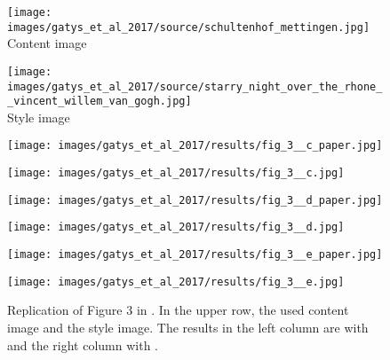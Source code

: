 \begin{figure}[H]
	\centering
	\begin{minipage}[t]{0.45\textwidth}
		\centering
		\texttt{[image: images/gatys\_et\_al\_2017/source/schultenhof\_mettingen.jpg]}
		Content image
	\end{minipage}
	\hfill%
	\begin{minipage}[t]{0.45\textwidth}
		\centering
		\texttt{[image: images/gatys\_et\_al\_2017/source/starry\_night\_over\_the\_rhone\_\_vincent\_willem\_van\_gogh.jpg]}\\
		Style image
	\end{minipage}
\hfill%
	\begin{minipage}[t]{0.45\textwidth}
		\centering
		\texttt{[image: images/gatys\_et\_al\_2017/results/fig\_3\_\_c\_paper.jpg]}
	\end{minipage}
	\hfill%
	\begin{minipage}[t]{0.45\textwidth}
		\centering
		\texttt{[image: images/gatys\_et\_al\_2017/results/fig\_3\_\_c.jpg]} 
	\end{minipage}
	\hfill%
	\begin{minipage}[t]{0.45\textwidth}
		\centering
		\texttt{[image: images/gatys\_et\_al\_2017/results/fig\_3\_\_d\_paper.jpg]} 
	\end{minipage}
	\hfill%
	\begin{minipage}[t]{0.45\textwidth}
		\centering
		\texttt{[image: images/gatys\_et\_al\_2017/results/fig\_3\_\_d.jpg]}
	\end{minipage}
	\hfill%
	\begin{minipage}[t]{0.45\textwidth}
		\centering
		\texttt{[image: images/gatys\_et\_al\_2017/results/fig\_3\_\_e\_paper.jpg]} 
	\end{minipage}
	\hfill%
	\begin{minipage}[t]{0.45\textwidth}
		\centering
		\texttt{[image: images/gatys\_et\_al\_2017/results/fig\_3\_\_e.jpg]}
	\end{minipage}
	\hfill%
\begin{minipage}[t]{0.45\textwidth}
	\centering
	\paper{}
\end{minipage}
\hfill%
\begin{minipage}[t]{0.45\textwidth}
	\centering
	\implementation{}
\end{minipage}
	\caption{Replication of Figure 3 in  \cite{GEB+2017}. In the upper row, the used content image and the style image. The results in the left column are with \paper{} and the right column with \implementation{}.}
	\label{fig:GEB+2017_fig3}
\end{figure}

